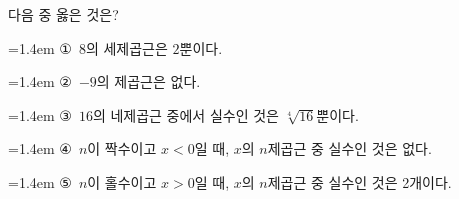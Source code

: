 다음 중 옳은 것은?
\par\medskip\par\noindent\hangindent=1.4em {\small ①}\ $8$의 세제곱근은 $2$뿐이다.\par\noindent\hangindent=1.4em {\small ②}\ $-9$의 제곱근은 없다.\par\noindent\hangindent=1.4em {\small ③}\ $16$의 네제곱근 중에서 실수인 것은 $\sqrt[4]{16}$뿐이다.\par\noindent\hangindent=1.4em {\small ④}\ $n$이 짝수이고 $x<0$일 때, $x$의 $n$제곱근 중 실수인 것은 없다.\par\noindent\hangindent=1.4em {\small ⑤}\ $n$이 홀수이고 $x>0$일 때, $x$의 $n$제곱근 중 실수인 것은 2개이다.\par\medskip

